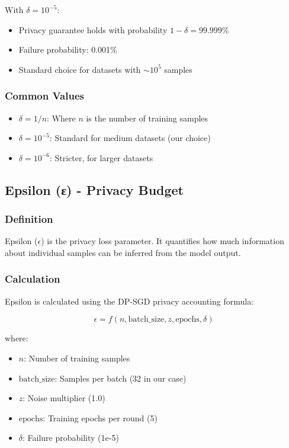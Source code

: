 \documentclass[12pt,a4paper]{article}
\begin{document}
With $\delta = 10^{-5}$:
\begin{itemize}
    \item Privacy guarantee holds with probability $1 - \delta = 99.999\%$
    \item Failure probability: 0.001\%
    \item Standard choice for datasets with $\sim 10^5$ samples
\end{itemize}

\subsubsection{Common Values}

\begin{itemize}
    \item $\delta = 1/n$: Where $n$ is the number of training samples
    \item $\delta = 10^{-5}$: Standard for medium datasets (our choice)
    \item $\delta = 10^{-6}$: Stricter, for larger datasets
\end{itemize}

\subsection{Epsilon (ε) - Privacy Budget}

\subsubsection{Definition}

Epsilon ($\epsilon$) is the privacy loss parameter. It quantifies how much information about individual samples can be inferred from the model output.

\subsubsection{Calculation}

Epsilon is calculated using the DP-SGD privacy accounting formula:

\begin{equation}
\epsilon = f(n, \text{batch\_size}, z, \text{epochs}, \delta)
\end{equation}

where:
\begin{itemize}
    \item $n$: Number of training samples
    \item $\text{batch\_size}$: Samples per batch (32 in our case)
    \item $z$: Noise multiplier (1.0)
    \item $\text{epochs}$: Training epochs per round (5)
    \item $\delta$: Failure probability (1e-5)
\end{itemize}
\end{document}
